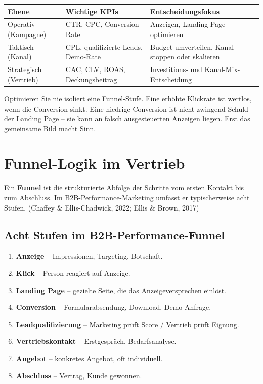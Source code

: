 \documentclass[11pt,a4paper,oneside]{article}
\newcommand{\fachbegriff}[1]{\textbf{#1}}
\newcommand{\quelle}[1]{{\footnotesize\color{lpGray}(#1)}}
\begin{document}
\begin{tabularx}{\linewidth}{@{}lXX@{}}
\toprule
\textbf{Ebene} & \textbf{Wichtige KPIs} & \textbf{Entscheidungsfokus} \\
\midrule
Operativ (Kampagne) & CTR, CPC, Conversion Rate & Anzeigen, Landing Page optimieren \\
Taktisch (Kanal) & CPL, qualifizierte Leads, Demo-Rate & Budget umverteilen, Kanal stoppen oder skalieren \\
Strategisch (Vertrieb) & CAC, CLV, ROAS, Deckungsbeitrag & Investitions- und Kanal-Mix-Entscheidung \\
\bottomrule
\end{tabularx}

\begin{merkbox}
Optimieren Sie nie isoliert eine Funnel-Stufe. Eine erhöhte Klickrate ist wertlos, wenn die Conversion sinkt. Eine niedrige Conversion ist nicht zwingend Schuld der Landing Page -- sie kann an falsch ausgesteuerten Anzeigen liegen. Erst das gemeinsame Bild macht Sinn.
\end{merkbox}

\section{Funnel-Logik im Vertrieb}

Ein \fachbegriff{Funnel} ist die strukturierte Abfolge der Schritte vom ersten Kontakt bis zum Abschluss. Im B2B-Performance-Marketing umfasst er typischerweise acht Stufen. \quelle{Chaffey \& Ellis-Chadwick, 2022; Ellis \& Brown, 2017}

\subsection{Acht Stufen im B2B-Performance-Funnel}

\begin{enumerate}
  \item \textbf{Anzeige} -- Impressionen, Targeting, Botschaft.
  \item \textbf{Klick} -- Person reagiert auf Anzeige.
  \item \textbf{Landing Page} -- gezielte Seite, die das Anzeigeversprechen einlöst.
  \item \textbf{Conversion} -- Formularabsendung, Download, Demo-Anfrage.
  \item \textbf{Leadqualifizierung} -- Marketing prüft Score / Vertrieb prüft Eignung.
  \item \textbf{Vertriebskontakt} -- Erstgespräch, Bedarfsanalyse.
  \item \textbf{Angebot} -- konkretes Angebot, oft individuell.
  \item \textbf{Abschluss} -- Vertrag, Kunde gewonnen.
\end{enumerate}
\end{document}
